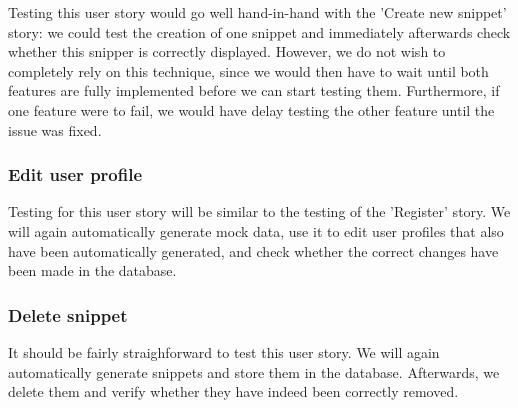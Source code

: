 \documentclass {article}
\begin{document}
Testing this user story would go well hand-in-hand with the 'Create new snippet' story: we could test the creation of one snippet and immediately afterwards check whether this snipper is correctly displayed.
However, we do not wish to completely rely on this technique, since we would then have to wait until both features are fully implemented before we can start testing them. Furthermore, if one feature were to fail, we would have delay testing the other feature until the issue was fixed.

\subsubsection*{Edit user profile}
Testing for this user story will be similar to the testing of the 'Register' story. We will again automatically generate mock data, use it to edit user profiles that also have been automatically generated, and check whether the correct changes have been made in the database.

\subsubsection*{Delete snippet}
It should be fairly straighforward to test this user story. We will again automatically generate snippets and store them in the database. Afterwards, we delete them and verify whether they have indeed been correctly removed.
\end{document}
